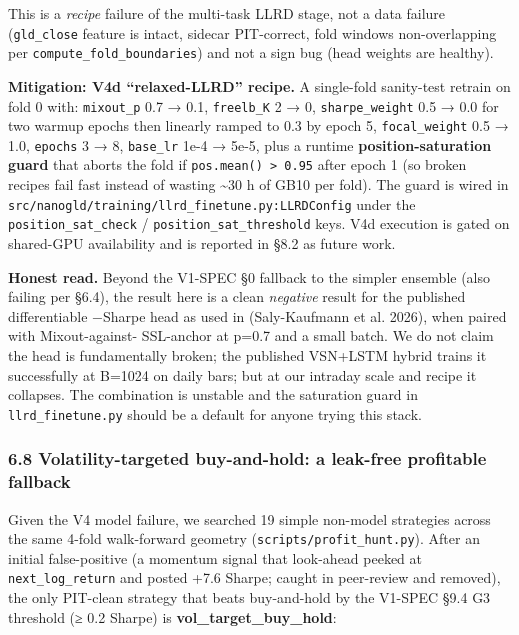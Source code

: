\documentclass[
]{article}
\begin{document}
This is a \emph{recipe} failure of the multi-task LLRD stage, not a data
failure (\texttt{gld\_close} feature is intact, sidecar PIT-correct,
fold windows non-overlapping per \texttt{compute\_fold\_boundaries}) and
not a sign bug (head weights are healthy).

\textbf{Mitigation: V4d ``relaxed-LLRD'' recipe.} A single-fold
sanity-test retrain on fold 0 with: \texttt{mixout\_p} 0.7 → 0.1,
\texttt{freelb\_K} 2 → 0, \texttt{sharpe\_weight} 0.5 → 0.0 for two
warmup epochs then linearly ramped to 0.3 by epoch 5,
\texttt{focal\_weight} 0.5 → 1.0, \texttt{epochs} 3 → 8,
\texttt{base\_lr} 1e-4 → 5e-5, plus a runtime
\textbf{position-saturation guard} that aborts the fold if
\texttt{\textbar{}pos\textbar{}.mean()\ \textgreater{}\ 0.95} after
epoch 1 (so broken recipes fail fast instead of wasting
\textasciitilde30 h of GB10 per fold). The guard is wired in
\texttt{src/nanogld/training/llrd\_finetune.py:LLRDConfig} under the
\texttt{position\_sat\_check} / \texttt{position\_sat\_threshold} keys.
V4d execution is gated on shared-GPU availability and is reported in
§8.2 as future work.

\textbf{Honest read.} Beyond the V1-SPEC §0 fallback to the simpler
ensemble (also failing per §6.4), the result here is a clean
\emph{negative} result for the published differentiable −Sharpe head as
used in (Saly-Kaufmann et al. 2026), when paired with Mixout-against-
SSL-anchor at p=0.7 and a small batch. We do not claim the head is
fundamentally broken; the published VSN+LSTM hybrid trains it
successfully at B=1024 on daily bars; but at our intraday scale and
recipe it collapses. The combination is unstable and the saturation
guard in \texttt{llrd\_finetune.py} should be a default for anyone
trying this stack.

\subsubsection{6.8 Volatility-targeted buy-and-hold: a leak-free
profitable
fallback}\label{volatility-targeted-buy-and-hold-a-leak-free-profitable-fallback}

Given the V4 model failure, we searched 19 simple non-model strategies
across the same 4-fold walk-forward geometry
(\texttt{scripts/profit\_hunt.py}). After an initial false-positive (a
momentum signal that look-ahead peeked at \texttt{next\_log\_return} and
posted +7.6 Sharpe; caught in peer-review and removed), the only
PIT-clean strategy that beats buy-and-hold by the V1-SPEC §9.4 G3
threshold (≥ 0.2 Sharpe) is \textbf{vol\_target\_buy\_hold}:
\end{document}
